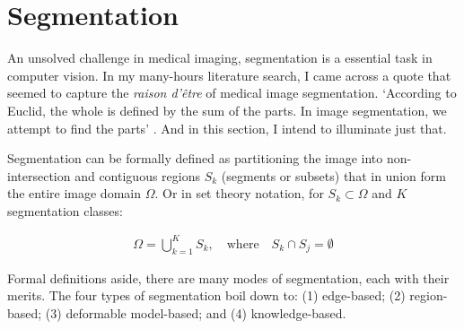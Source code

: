 \documentclass{bmcart}
\begin{document}
\section*{Segmentation}
An unsolved challenge in medical imaging, segmentation is a essential task in computer vision. In my many-hours literature search, I came across a quote that seemed to capture the \textit{raison d'\^{e}tre} of medical image segmentation. `According to Euclid, the whole is defined by the sum of the parts. In image segmentation, we attempt to find the parts' \cite{acton_biomedical_2009}. And in this section, I intend to illuminate just that. 
\par Segmentation can be formally defined as partitioning the image into non-intersection and contiguous regions $S_k$ (segments or subsets) that in union form the entire image domain $\Omega$. Or in set theory notation, for $S_k \subset \Omega$ and $K$ segmentation classes:
\begin{ceqn}
\begin{align}
    \Omega = \bigcup_{k=1}^{K} S_k, \mathrm{\quad where \quad} S_k \cap S_j = \emptyset
\end{align}
\end{ceqn}
Formal definitions aside, there are many modes of segmentation, each with their merits. The four types of segmentation boil down to: (1) edge-based; (2) region-based; (3) deformable model-based; and (4) knowledge-based.
\end{document}
